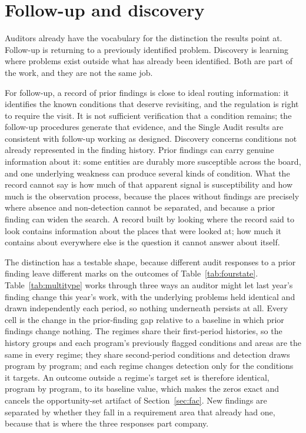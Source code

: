 \section{Follow-up and discovery}\label{sec:design}

Auditors already have the vocabulary for the distinction the results point
at. Follow-up is returning to a previously identified problem. Discovery is
learning where problems exist outside what has already been identified. Both
are part of the work, and they are not the same job.

For follow-up, a record of prior findings is close to ideal routing
information: it identifies the known conditions that deserve revisiting, and
the regulation is right to require the visit. It is not sufficient
verification that a condition remains; the follow-up procedures generate that evidence, and the
Single Audit results are consistent with follow-up working as designed.
Discovery concerns conditions not already represented in the finding history.
Prior findings can carry genuine information about it: some entities are
durably more susceptible across the board, and one underlying weakness can
produce several kinds of condition. What the record cannot say is how much of
that apparent signal is susceptibility and how much is the observation
process, because the places without findings are precisely where absence and
non-detection cannot be separated, and because a prior finding can widen the
search. A record built by looking where the record said to look contains
information about the places that were looked at; how much it contains about
everywhere else is the question it cannot answer about itself.

The distinction has a testable shape, because different audit responses to a
prior finding leave different marks on the outcomes of
Table~\ref{tab:fourstate}. Table~\ref{tab:multitype} works through three ways
an auditor might let last year's finding change this year's work, with the
underlying problems held identical and drawn independently each period, so
nothing underneath persists at all. Every cell is the change in the
prior-finding gap relative to a baseline in which prior findings change
nothing. The regimes share their first-period histories, so the history
groups and each program's previously flagged conditions and areas are the
same in every regime; they share second-period conditions and detection draws
program by program; and each regime changes detection only for the conditions
it targets. An outcome outside a regime's target set is therefore identical,
program by program, to its baseline value, which makes the zeros exact and
cancels the opportunity-set artifact of Section~\ref{sec:fac}. New findings are
separated by whether they fall in a requirement area that already had one,
because that is where the three responses part company.

